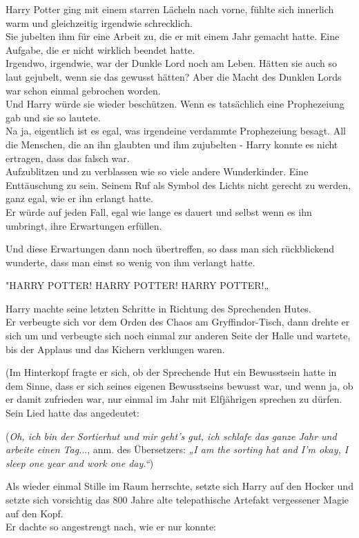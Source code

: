 {Harry Potter ging mit einem starren Lächeln nach vorne, fühlte sich innerlich warm und gleichzeitig irgendwie schrecklich.\\ Sie jubelten ihm für eine Arbeit zu, die er mit einem Jahr gemacht hatte. Eine Aufgabe, die er nicht wirklich beendet hatte.\\ Irgendwo, irgendwie, war der Dunkle Lord noch am Leben. Hätten sie auch so laut gejubelt, wenn sie das gewusst hätten? Aber die Macht des Dunklen Lords war schon einmal gebrochen worden.\\ Und Harry würde sie wieder beschützen. Wenn es tatsächlich eine Prophezeiung gab und sie so lautete.\\ Na ja, eigentlich ist es egal, was irgendeine verdammte Prophezeiung besagt. All die Menschen, die an ihn glaubten und ihm zujubelten - Harry konnte es nicht ertragen, dass das falsch war.\\ Aufzublitzen und zu verblassen wie so viele andere Wunderkinder. Eine Enttäuschung zu sein. Seinem Ruf als Symbol des Lichts nicht gerecht zu werden, ganz egal, wie er ihn erlangt hatte.\\ Er würde auf jeden Fall, egal wie lange es dauert und selbst wenn es ihn umbringt, ihre Erwartungen erfüllen.

Und diese Erwartungen dann noch übertreffen, so dass man sich rückblickend wunderte, dass man einst so wenig von ihm verlangt hatte.

"HARRY POTTER! HARRY POTTER! HARRY POTTER!„

Harry machte seine letzten Schritte in Richtung des Sprechenden Hutes.\\ Er verbeugte sich vor dem Orden des Chaos am Gryffindor-Tisch, dann drehte er sich um und verbeugte sich noch einmal zur anderen Seite der Halle und wartete, bis der Applaus und das Kichern verklungen waren.

(Im Hinterkopf fragte er sich, ob der Sprechende Hut ein Bewusstsein hatte in dem Sinne, dass er sich seines eigenen Bewusstseins bewusst war, und wenn ja, ob er damit zufrieden war, nur einmal im Jahr mit Elfjährigen sprechen zu dürfen.\\ Sein Lied hatte das angedeutet:

(\emph{Oh, ich bin der Sortierhut und mir geht's gut, ich schlafe das ganze Jahr und arbeite einen Tag.}.., anm. des Übersetzers: \emph{„I am the sorting hat and I'm okay, I sleep one year and work one day.“})

Als wieder einmal Stille im Raum herrschte, setzte sich Harry auf den Hocker und setzte sich vorsichtig das 800 Jahre alte telepathische Artefakt vergessener Magie auf den Kopf.\\ Er dachte so angestrengt nach, wie er nur konnte:

}

